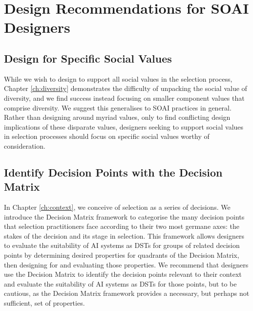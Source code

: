 
\section{Design Recommendations for SOAI Designers}
\subsection{Design for Specific Social Values}
While we wish to design to support all social values in the selection process, Chapter \ref{ch:diversity} demonstrates the difficulty of unpacking the social value of diversity, and we find success instead focusing on smaller component values that comprise diversity. We suggest this generalises to SOAI practices in general. Rather than designing around myriad values, only to find conflicting design implications of these disparate values, designers seeking to support social values in selection processes should focus on specific social values worthy of consideration.

\subsection{Identify Decision Points with the Decision Matrix}
In Chapter \ref{ch:context}, we conceive of selection as a series of decisions. We introduce the Decision Matrix framework to categorise the many decision points that selection practitioners face according to their two most germane axes: the stakes of the decision and its stage in selection. This framework allows designers to evaluate the suitability of AI systems as DSTs for groups of related decision points by determining desired properties for quadrants of the Decision Matrix, then designing for and evaluating those properties. We recommend that designers use the Decision Matrix to identify the decision points relevant to their context and evaluate the suitability of AI systems as DSTs for those points, but to be cautious, as the Decision Matrix framework provides a necessary, but perhaps not sufficient, set of properties. 

